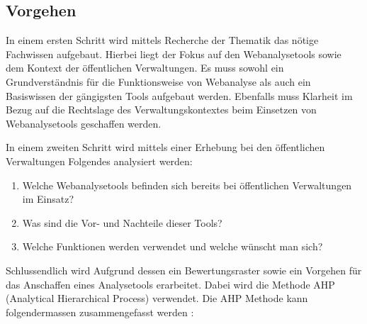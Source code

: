 \subsection{Vorgehen}

In einem ersten Schritt wird mittels Recherche der Thematik das nötige Fachwissen aufgebaut. Hierbei liegt der Fokus auf den Webanalysetools sowie dem Kontext der öffentlichen Verwaltungen. Es muss  sowohl ein Grundverständnis für die Funktionsweise von Webanalyse als auch ein Basiswissen der gängigsten Tools aufgebaut werden. Ebenfalls muss Klarheit im Bezug auf die Rechtslage des Verwaltungskontextes beim Einsetzen von Webanalysetools geschaffen werden. 

In einem zweiten Schritt wird mittels einer Erhebung bei den öffentlichen Verwaltungen Folgendes analysiert werden:

\begin{enumerate}
    \item Welche Webanalysetools befinden sich bereits bei öffentlichen Verwaltungen im Einsatz?
    \item Was sind die Vor- und Nachteile dieser Tools?
    \item Welche Funktionen werden verwendet und welche wünscht man sich?
\end{enumerate}

Schlussendlich wird Aufgrund dessen ein Bewertungsraster sowie ein Vorgehen für das Anschaffen eines Analysetools erarbeitet. Dabei wird die Methode AHP (Analytical Hierarchical Process)  verwendet. 
Die AHP Methode kann folgendermassen zusammengefasst werden \parencite[S. 176]{nakatani2011toolselectionmethod}:

